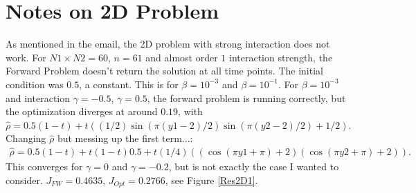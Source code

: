 \documentclass[11pt, a4paper]{article}
\theoremstyle{definition}
\begin{document}
\section{Notes on 2D Problem}

As mentioned in the email, the 2D problem with strong interaction does not work. For $N1 \times N2 = 60$, $n=61$ and almost order $1$ interaction strength, the Forward Problem doesn't return the solution at all time points. The initial condition was $0.5$, a constant. This is for $\beta = 10^{-3}$ and $\beta = 10^{-1}$. 
For $\beta = 10^{-3}$ and interaction $\gamma = -0.5$, $\gamma = 0.5$, the forward problem is running correctly, but the optimization diverges at around $0.19$, with $\hat \rho = 0.5(1-t) + t((1/2)\sin(\pi(y1 - 2)/2) \sin(\pi(y2 - 2)/2) + 1/2)$.\\
Changing $\hat \rho$ but messing up the first term...:
\begin{align*}
\hat \rho = 0.5(1-t) + t(1-t)0.5 + t(1/4)((\cos(\pi y1 + \pi)+2)(\cos(\pi y2 + \pi)+2)).
\end{align*} 
This converges for $\gamma =0$ and $\gamma = -0.2$, but is not exactly the case I wanted to consider. $J_{FW} = 0.4635 $, $J_{Opt} = 0.2766$, see Figure \ref{Res2D1}.
\end{document}
